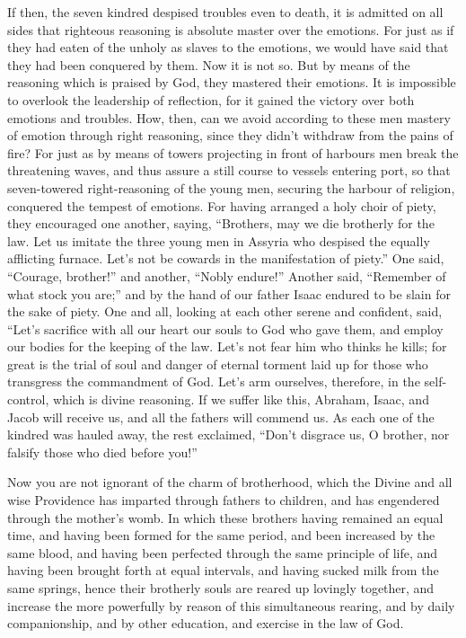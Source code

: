 If then, the seven kindred despised troubles even to death,
it is admitted on all sides that righteous reasoning is absolute master
over the emotions.  For just as if they had eaten of the
unholy as slaves to the emotions, we would have said that they had been
conquered by them.  Now it is not so. But by means of the
reasoning which is praised by God, they mastered their emotions.
 It is impossible to overlook the leadership of reflection,
for it gained the victory over both emotions and troubles. 
How, then, can we avoid according to these men mastery of emotion
through right reasoning, since they didn't withdraw from the pains of
fire?  For just as by means of towers projecting in front of
harbours men break the threatening waves, and thus assure a still course
to vessels entering port,  so that seven-towered
right-reasoning of the young men, securing the harbour of religion,
conquered the tempest of emotions.  For having arranged a
holy choir of piety, they encouraged one another, saying, 
``Brothers, may we die brotherly for the law. Let us imitate the three
young men in Assyria who despised the equally afflicting furnace.
 Let's not be cowards in the manifestation of piety.''
 One said, ``Courage, brother!'' and another, ``Nobly
endure!''  Another said, ``Remember of what stock you
are;'' and by the hand of our father Isaac endured to be slain for the
sake of piety.  One and all, looking at each other serene
and confident, said, ``Let's sacrifice with all our heart our souls to
God who gave them, and employ our bodies for the keeping of the law.
 Let's not fear him who thinks he kills;  for
great is the trial of soul and danger of eternal torment laid up for
those who transgress the commandment of God.  Let's arm
ourselves, therefore, in the self-control, which is divine reasoning.
 If we suffer like this, Abraham, Isaac, and Jacob will
receive us, and all the fathers will commend us.  As each
one of the kindred was hauled away, the rest exclaimed, ``Don't disgrace
us, O brother, nor falsify those who died before you!''

 Now you are not ignorant of the charm of brotherhood,
which the Divine and all wise Providence has imparted through fathers to
children, and has engendered through the mother's womb.  In
which these brothers having remained an equal time, and having been
formed for the same period, and been increased by the same blood, and
having been perfected through the same principle of life, 
and having been brought forth at equal intervals, and having sucked milk
from the same springs, hence their brotherly souls are reared up
lovingly together,  and increase the more powerfully by
reason of this simultaneous rearing, and by daily companionship, and by
other education, and exercise in the law of God.


